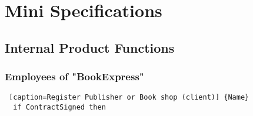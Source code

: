 \documentclass[12pt,a4paper]{article}
\begin{document}
\section{Mini Specifications}
\subsection{Internal Product Functions}
\subsubsection{Employees of "BookExpress"}

  \begin{lstlisting} [caption=Register Publisher or Book shop (client)] {Name}
  if ContractSigned then 
  \end{lstlisting}
\end{document}
